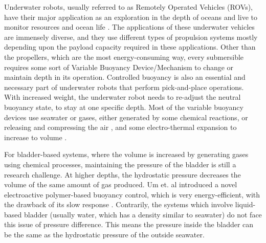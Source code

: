 \documentclass[conference, letterpaper]{IEEEtran}
\begin{document}
Underwater robots, usually referred to as Remotely Operated Vehicles (ROVs), have their major application as an exploration in the depth of oceans and live to monitor resources and ocean life \cite{Kirkwood2002ActiveROV}. The applications of these underwater vehicles are immensely diverse, and they use different types of propulsion systems mostly depending upon the payload capacity required in these applications. Other than the propellers, which are the most energy-consuming way, every submersible requires some sort of Variable Buoyancy Device/Mechanism to change or maintain depth in its operation. Controlled buoyancy is also  an essential and
necessary part of underwater robots that perform
pick-and-place operations. With increased weight, the underwater robot needs to re-adjust the neutral buoyancy state, to stay at one specific depth. Most of the variable buoyancy devices use seawater \cite{Vasiljevic2019,Kobayashi2010} or gases, either generated by some chemical reactions, \cite{Um2011AVehicles,Chen2017AMuscles,yazji2021buoyancy} or releasing and compressing the air \cite{Wood2015AutomatedCrawler}, and some electro-thermal expansion to increase to volume \cite{Hou2020DevelopmentModule}.

For bladder-based systems, where the volume is increased by generating gases using chemical processes, maintaining the pressure of the bladder is still a  research challenge. At higher depths, the hydrostatic pressure decreases the volume of the same amount of gas produced. Um et. al \cite{Um2011InspiredVehicles} introduced a novel electroactive polymer-based buoyancy control, which is very energy-efficient, with the drawback of its slow response \cite{Chen2017AMuscles}. Contrarily, the systems which involve liquid-based bladder (usually water, which has a density similar to seawater) do not face this issue of pressure difference. This means the pressure inside the bladder can be the same as the hydrostatic pressure of the outside seawater.
\end{document}
